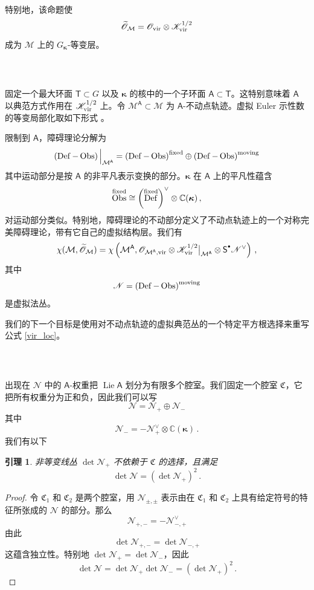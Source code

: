 \documentclass[12pt]{article}
\newcommand{\C}{\mathbb{C}}
\newcommand{\cO}{\mathscr{O}}
\newcommand{\cN}{\mathscr{N}}
\newcommand{\Ovir}{\mathscr{O}_{\textup{vir}}}
\newcommand{\Kvir}{\mathscr{K}_{\textup{vir}}}
\newcommand{\cM}{\mathcal{M}}
\newcommand{\fC}{\mathfrak{C}}
\DeclareMathOperator{\Lie}{Lie}
\DeclareMathOperator{\Def}{Def}
\DeclareMathOperator{\Obs}{Obs}
\newcommand{\tO}{\widetilde{\mathscr{O}}}
\newcommand{\bT}{\mathsf{T}}
\newcommand{\bS}{\mathsf{S}}
\newcommand{\bA}{\mathsf{A}}
\newcommand{\bk}{\boldsymbol{\kappa}}
\newcommand{\Sd}{{\bS}^{\raisebox{0.5mm}{$\scriptscriptstyle \bullet$}}}
\newcommand{\Gk}{G_{\bk}}
\newtheorem{Lemma}{引理}[section]
\theoremstyle{definition}
\begin{document}
特别地，该命题使
$$
\tO_{\cM} = \Ovir \otimes \Kvir^{1/2}
$$
成为 $\cM$ 上的 $\Gk$-等变层。

\subsubsection{\ }

固定一个最大环面 $\bT \subset G$ 以及 $\bk$ 的核中的一个子环面 $\bA \subset \bT$。这特别意味着 $\bA$ 以典范方式作用在 $\Kvir^{1/2}$ 上。令 $\cM^{\bA}\subset \cM$ 为 $\bA$-不动点轨迹。虚拟 Euler 示性数的等变局部化取如下形式 \cite{GP,FG}。

限制到 $\bA$，障碍理论分解为
$$
\left(\Def-\Obs\right)\Big|_{\cM^{\bA}} =
\left(\Def-\Obs\right)^{\textup{fixed}} \oplus
\left(\Def-\Obs\right)^{\textup{moving}}
$$
其中运动部分是按 $\bA$ 的非平凡表示变换的部分。$\bk$ 在 $\bA$ 上的平凡性蕴含
$$
\Obs ^{\textup{fixed}} \cong \left(
\Def ^{\textup{fixed}}\right)^{\vee} \otimes \C(\bk)\,,
$$
对运动部分类似。特别地，障碍理论的不动部分定义了不动点轨迹上的一个对称完美障碍理论，带有它自己的虚拟结构层。我们有
\begin{equation}
\chi(\cM,\tO_{\cM}) = \chi\left(\cM^{\bA}, \cO_{\cM^{\bA},\textup{vir}}
\otimes \Kvir^{1/2}\big|_{\cM^{\bA}} \otimes \Sd \cN^{\vee} \right)\,,
\label{vir_loc}
\end{equation}
其中
$$
\cN = \left(\Def-\Obs\right) ^{\textup{moving}}
$$
是虚拟法丛。

我们的下一个目标是使用对不动点轨迹的虚拟典范丛的一个特定平方根选择来重写公式 \eqref{vir_loc}。

\subsubsection{\ }

出现在 $\cN$ 中的 $\bA$-权重把 $\Lie \bA$ 划分为有限多个腔室。我们固定一个腔室 $\fC$，它把所有权重分为正和负，因此我们可以写
$$
\cN =
\cN_{+} \oplus
\cN_{-}
$$
其中
$$
\cN_{-} = - \cN_{+}^{\vee}
\otimes \C(\bk) \,.
$$
我们有以下

\begin{Lemma}
非等变线丛 $\det \cN_+$ 不依赖于 $\fC$ 的选择，且满足
$$
\det \cN = (\det \cN_+)^2 \,.
$$
\end{Lemma}

\begin{proof}
令 $\fC_1$ 和 $\fC_2$ 是两个腔室，用 $\cN_{\pm,\pm}$ 表示由在 $\fC_1$ 和 $\fC_2$ 上具有给定符号的特征所张成的 $\cN$ 的部分。那么
$$
\cN_{+,-} = - \cN_{-,+}^{\vee}
$$
由此
$$
\det \cN_{+,-} = \det \cN_{-,+}
$$
这蕴含独立性。特别地 $\det \cN_+ =
\det \cN_-$，因此
$$
\det \cN = \det \cN_+  \det \cN_- = (\det \cN_+)^2 \,.
$$
\end{proof}
\end{document}

